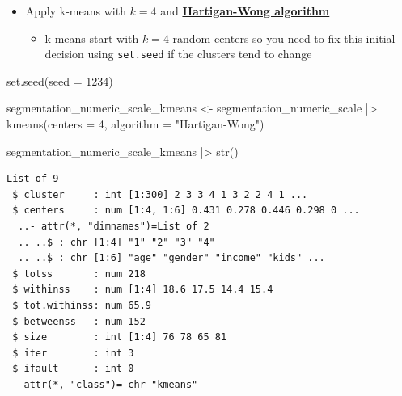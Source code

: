 \documentclass[
  ignorenonframetext,
]{beamer}
\newenvironment{Shaded}{\begin{snugshade}}{\end{snugshade}}
\newcommand{\AttributeTok}[1]{\textcolor[rgb]{0.40,0.45,0.13}{#1}}
\newcommand{\DecValTok}[1]{\textcolor[rgb]{0.68,0.00,0.00}{#1}}
\newcommand{\FunctionTok}[1]{\textcolor[rgb]{0.28,0.35,0.67}{#1}}
\newcommand{\NormalTok}[1]{\textcolor[rgb]{0.00,0.23,0.31}{#1}}
\newcommand{\OtherTok}[1]{\textcolor[rgb]{0.00,0.23,0.31}{#1}}
\newcommand{\SpecialCharTok}[1]{\textcolor[rgb]{0.37,0.37,0.37}{#1}}
\newcommand{\StringTok}[1]{\textcolor[rgb]{0.13,0.47,0.30}{#1}}
\providecommand{\tightlist}{%
  \setlength{\itemsep}{0pt}\setlength{\parskip}{0pt}}\usepackage{longtable,booktabs,array}
\begin{document}
\begin{frame}[fragile]{}
\label{section-48}
\begin{itemize}
\item
  Apply k-means with \(k = 4\) and
  \href{https://en.wikipedia.org/wiki/K-means_clustering}{\textbf{Hartigan-Wong
  algorithm}}

  \begin{itemize}
  \tightlist
  \item
    k-means start with \(k = 4\) random centers so you need to fix this
    initial decision using \texttt{set.seed} if the clusters tend to
    change
  \end{itemize}
\end{itemize}

\tiny

\begin{Shaded}
\begin{Highlighting}[]
\FunctionTok{set.seed}\NormalTok{(}\AttributeTok{seed =} \DecValTok{1234}\NormalTok{)}

\NormalTok{segmentation\_numeric\_scale\_kmeans }\OtherTok{\textless{}{-}}\NormalTok{ segmentation\_numeric\_scale }\SpecialCharTok{|\textgreater{}} 
  \FunctionTok{kmeans}\NormalTok{(}\AttributeTok{centers =} \DecValTok{4}\NormalTok{, }
         \AttributeTok{algorithm =} \StringTok{"Hartigan{-}Wong"}\NormalTok{)}

\NormalTok{segmentation\_numeric\_scale\_kmeans }\SpecialCharTok{|\textgreater{}} \FunctionTok{str}\NormalTok{()}
\end{Highlighting}
\end{Shaded}

\begin{verbatim}
List of 9
 $ cluster     : int [1:300] 2 3 3 4 1 3 2 2 4 1 ...
 $ centers     : num [1:4, 1:6] 0.431 0.278 0.446 0.298 0 ...
  ..- attr(*, "dimnames")=List of 2
  .. ..$ : chr [1:4] "1" "2" "3" "4"
  .. ..$ : chr [1:6] "age" "gender" "income" "kids" ...
 $ totss       : num 218
 $ withinss    : num [1:4] 18.6 17.5 14.4 15.4
 $ tot.withinss: num 65.9
 $ betweenss   : num 152
 $ size        : int [1:4] 76 78 65 81
 $ iter        : int 3
 $ ifault      : int 0
 - attr(*, "class")= chr "kmeans"
\end{verbatim}
\end{frame}
\end{document}
